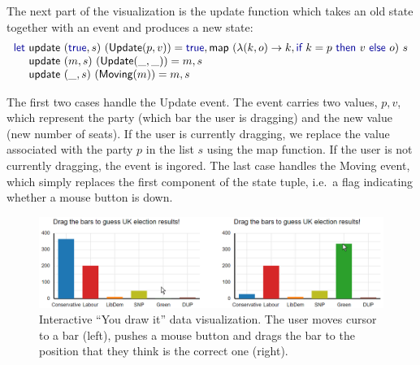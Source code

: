 \documentclass{jfp}
\newcommand{\ident}[1]{\textnormal{\textcolor{idclr}{\sffamily #1}}}
\newcommand{\fkvd}[1]{\textnormal{\textcolor{fkvdclr}{\sffamily #1}}}
\begin{document}
The next part of the visualization is the \ident{update} function which takes an old state together
with an event and produces a new state:
%
\begin{equation*}
\begin{array}{l}
\fkvd{let}~\ident{update}~(\fkvd{true},s)~(\ident{Update}(p, v)) =
  \fkvd{true}, \ident{map}~(\lambda(k, o) \rightarrow k, \fkvd{if}~k = p~\fkvd{then}~v~\fkvd{else}~o)~s\\
\hspace{1.05em}~\ident{update}~(m,s)~(\ident{Update}(\_, \_)) = m,s\\
\hspace{1.05em}~\ident{update}~(\_,s)~(\ident{Moving}(m)) = m,s\\
\end{array}
\end{equation*}

\vspace{-0.5em}
\noindent
The first two cases handle the \ident{Update} event. The event carries two values, $p, v$, which
represent the party (which bar the user is dragging) and the new value (new number of seats).
If the user is currently dragging, we replace the value associated with the party $p$ in the
list $s$ using the \ident{map} function. If the user is not currently dragging, the event is ingored.
The last case handles the \ident{Moving} event, which simply replaces the first component of the
state tuple, i.e.~a flag indicating whether a mouse button is down.


\begin{figure}[t]
  \includegraphics[scale=0.57]{figures/youdraw}
  \vspace{0.25em}
  \caption{Interactive ``You draw it'' data visualization. The user moves cursor to a bar (left),
    pushes a mouse button and drags the bar to the position that they think is the correct one (right).}
  \label{fig:youdraw}
\end{figure}
\end{document}
